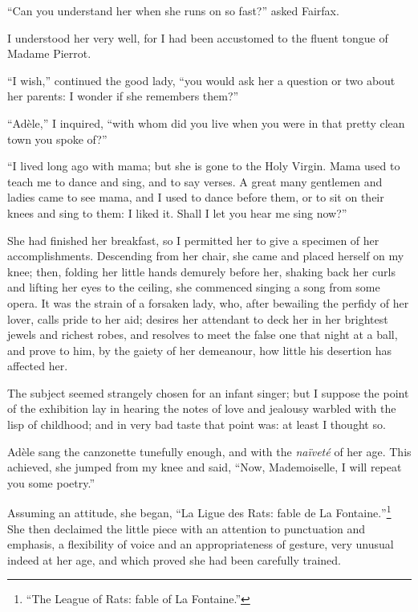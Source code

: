 \enquote{Can you understand her when she runs on so fast?} asked \Mrs{}
Fairfax.

I understood her very well, for I had been accustomed to the fluent
tongue of Madame Pierrot.

\enquote{I wish,} continued the good lady, \enquote{you would ask her a
question or two about her parents: I wonder if she remembers them?}

\enquote{Adèle,} I inquired, \enquote{with whom did you live when you
were in that pretty clean town you spoke of?}

\enquote{I lived long ago with mama; but she is gone to the Holy
Virgin. Mama used to teach me to dance and sing, and to say verses. A
great many gentlemen and ladies came to see mama, and I used to dance
before them, or to sit on their knees and sing to them: I liked it. 
Shall I let you hear me sing now?}

She had finished her breakfast, so I permitted her to give a specimen of
her accomplishments. Descending from her chair, she came and placed
herself on my knee; then, folding her little hands demurely before her,
shaking back her curls and lifting her eyes to the ceiling, she
commenced singing a song from some opera. It was the strain of a
forsaken lady, who, after bewailing the perfidy of her lover, calls
pride to her aid; desires her attendant to deck her in her brightest
jewels and richest robes, and resolves to meet the false one that night
at a ball, and prove to him, by the gaiety of her demeanour, how little
his desertion has affected her.

The subject seemed strangely chosen for an infant singer; but I suppose
the point of the exhibition lay in hearing the notes of love and
jealousy warbled with the lisp of childhood; and in very bad taste that
point was: at least I thought so.

Adèle sang the canzonette tunefully enough, and with the \emph{naïveté}
of her age. This achieved, she jumped from my knee and said,
\enquote{Now, Mademoiselle, I will repeat you some poetry.}

Assuming an attitude, she began, \foreignquote{french}{La Ligue des Rats: fable de La
Fontaine.}\footnote{\enquote{The League of Rats: fable of La Fontaine.}} %
She then declaimed the little piece with an attention to
punctuation and emphasis, a flexibility of voice and an appropriateness
of gesture, very unusual indeed at her age, and which proved she had
been carefully trained.


